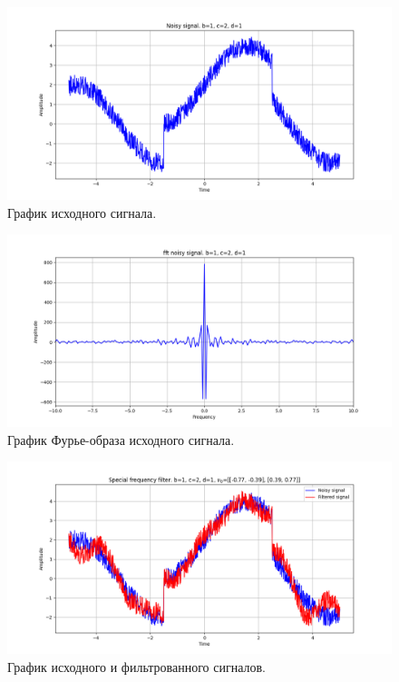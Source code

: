 \documentclass[a4paper, 12pt]{article}
\begin{document}
    
    \begin{figure}[!htb]
        \centering
        \includegraphics[scale=0.485]{1_u_nospec.png}
        \captionsetup{skip=0pt}
        \caption{График исходного сигнала.}
        \label{fig:fig69}
    \end{figure}
    \begin{figure}[!htb]
        \centering
        \includegraphics[scale=0.485]{1_fft_u_nospec.png}
        \captionsetup{skip=0pt}
        \caption{График Фурье-образа исходного сигнала.}
        \label{fig:fig70}
    \end{figure}
    \begin{figure}[!htb]
        \centering
        \includegraphics[scale=0.485]{1_u_flt_u_nospec.png}
        \captionsetup{skip=0pt}
        \caption{График исходного и фильтрованного сигналов.}
        \label{fig:fig71}
    \end{figure}
\end{document}
